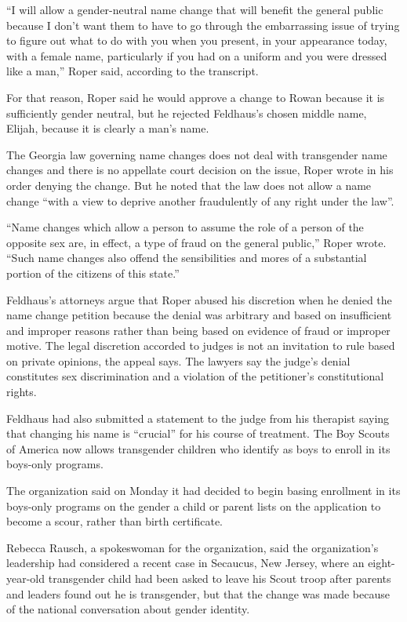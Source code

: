 “I will allow a gender-neutral name change that will benefit the general public because I don’t want them to have to go through the embarrassing issue of trying to figure out what to do with you when you present, in your appearance today, with a female name, particularly if you had on a uniform and you were dressed like a man,” Roper said, according to the transcript.

For that reason, Roper said he would approve a change to Rowan because it is sufficiently gender neutral, but he rejected Feldhaus’s chosen middle name, Elijah, because it is clearly a man’s name.

The Georgia law governing name changes does not deal with transgender name changes and there is no appellate court decision on the issue, Roper wrote in his order denying the change. But he noted that the law does not allow a name change “with a view to deprive another fraudulently of any right under the law”.

“Name changes which allow a person to assume the role of a person of the opposite sex are, in effect, a type of fraud on the general public,” Roper wrote. “Such name changes also offend the sensibilities and mores of a substantial portion of the citizens of this state.”

Feldhaus’s attorneys argue that Roper abused his discretion when he denied the name change petition because the denial was arbitrary and based on insufficient and improper reasons rather than being based on evidence of fraud or improper motive. The legal discretion accorded to judges is not an invitation to rule based on private opinions, the appeal says. The lawyers say the judge’s denial constitutes sex discrimination and a violation of the petitioner’s constitutional rights.

Feldhaus had also submitted a statement to the judge from his therapist saying that changing his name is “crucial” for his course of treatment.
The Boy Scouts of America now allows transgender children who identify as boys to enroll in its boys-only programs.

The organization said on Monday it had decided to begin basing enrollment in its boys-only programs on the gender a child or parent lists on the application to become a scour, rather than birth certificate.

Rebecca Rausch, a spokeswoman for the organization, said the organization’s leadership had considered a recent case in Secaucus, New Jersey, where an eight-year-old transgender child had been asked to leave his Scout troop after parents and leaders found out he is transgender, but that the change was made because of the national conversation about gender identity.

